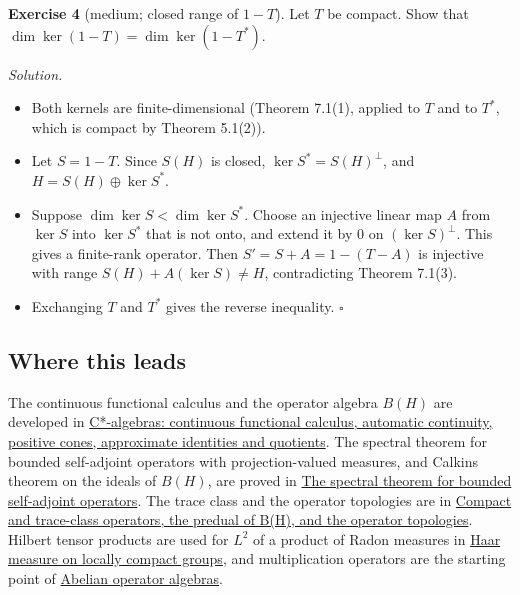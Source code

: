 \documentclass[
  english,
  11pt,
  a4paper,
]{article}
\providecommand{\tightlist}{%
  \setlength{\itemsep}{0pt}\setlength{\parskip}{0pt}}
\begin{document}
\textbf{Exercise 4} (medium; closed range of \(1-T\)). Let \(T\) be
compact. Show that \(\dim\ker(1-T)=\dim\ker(1-T^*)\).

\emph{Solution.}

\begin{itemize}
\tightlist
\item
  Both kernels are finite-dimensional (Theorem 7.1(1), applied to \(T\)
  and to \(T^*\), which is compact by Theorem 5.1(2)).
\item
  Let \(S=1-T\). Since \(S(H)\) is closed, \(\ker S^*=S(H)^\perp\), and
  \(H=S(H)\oplus\ker S^*\).
\item
  Suppose \(\dim\ker S<\dim\ker S^*\). Choose an injective linear map
  \(A\) from \(\ker S\) into \(\ker S^*\) that is not onto, and extend
  it by \(0\) on \((\ker S)^\perp\). This gives a finite-rank operator.
  Then \(S'=S+A=1-(T-A)\) is injective with range
  \(S(H)+A(\ker S)\ne H\), contradicting Theorem 7.1(3).
\item
  Exchanging \(T\) and \(T^*\) gives the reverse inequality. \(\square\)
\end{itemize}

\subsection{Where this
leads}\label{hilbert-spaces-and-compact-operators--where-this-leads}

The continuous functional calculus and the operator algebra \(B(H)\) are
developed in
\href{https://kokunoyumeto.github.io/open-math-courses/courses/harmonic-analysis-on-locally-compact-groups/reader/programme-reading.html\#ref-96a615e4209af567}{C*-algebras:
continuous functional calculus, automatic continuity, positive cones,
approximate identities and quotients}. The spectral theorem for bounded
self-adjoint operators with projection-valued measures, and
Calkin\textquotesingle s theorem on the ideals of \(B(H)\), are proved
in
\href{https://kokunoyumeto.github.io/open-math-courses/courses/harmonic-analysis-on-locally-compact-groups/reader/programme-reading.html\#ref-c87ebece35f15b9d}{The
spectral theorem for bounded self-adjoint operators}. The trace class
and the operator topologies are in
\href{https://kokunoyumeto.github.io/open-math-courses/courses/harmonic-analysis-on-locally-compact-groups/reader/programme-reading.html\#ref-b8bfb9db42bafead}{Compact
and trace-class operators, the predual of B(H), and the operator
topologies}. Hilbert tensor products are used for \(L^2\) of a product
of Radon measures in
\href{https://kokunoyumeto.github.io/open-math-courses/courses/harmonic-analysis-on-locally-compact-groups/reader/programme-reading.html\#ref-23bd0edc6019793c}{Haar
measure on locally compact groups}, and multiplication operators are the
starting point of
\href{https://kokunoyumeto.github.io/open-math-courses/courses/harmonic-analysis-on-locally-compact-groups/reader/programme-reading.html\#ref-97e06a521795b886}{Abelian
operator algebras}.
\end{document}

